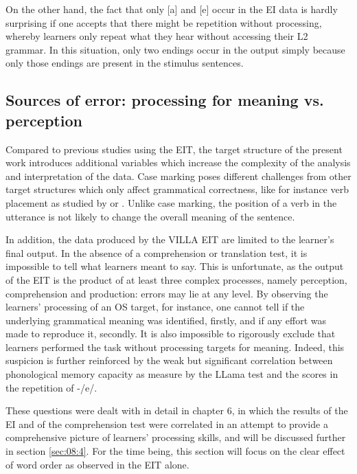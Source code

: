 On the other hand, the fact that only [a] and [e] occur in the EI data is hardly surprising if one accepts that there might be repetition without processing, whereby learners only repeat what they hear without accessing their L2 grammar. In this situation, only two endings occur in the output simply because only those endings are present in the stimulus sentences.

\subsection{Sources of error: processing for meaning vs. perception}\label{sec:08:2.2}

Compared to previous studies using the EIT, the target structure of the present work introduces additional variables which increase the complexity of the analysis and interpretation of the data. Case marking poses different challenges from other target structures which only affect grammatical correctness, like for instance verb placement as studied by \citet{Håkansson1989} or \citet{Schimke2011}. Unlike case marking, the position of a verb in the utterance is not likely to change the overall meaning of the sentence. 

In addition, the data produced by the VILLA EIT are limited to the learner’s final output. In the absence of a comprehension or translation test, it is impossible to tell what learners meant to say. This is unfortunate, as the output of the EIT is the product of at least three complex processes, namely perception, comprehension and production: errors may lie at any level. By observing the learners’ processing of an OS target, for instance, one cannot tell if the underlying grammatical meaning was identified, firstly, and if any effort was made to reproduce it, secondly. It is also impossible to rigorously exclude that learners performed the task without processing targets for meaning. Indeed, this suspicion is further reinforced by the weak but significant correlation between phonological memory capacity as measure by the LLama test and the scores in the repetition of -/e/.

These questions were dealt with in detail in chapter 6, in which the results of the EI and of the comprehension test were correlated in an attempt to provide a comprehensive picture of learners’ processing skills, and will be discussed further in section \ref{sec:08:4}. For the time being, this section will focus on the clear effect of word order as observed in the EIT alone. 

